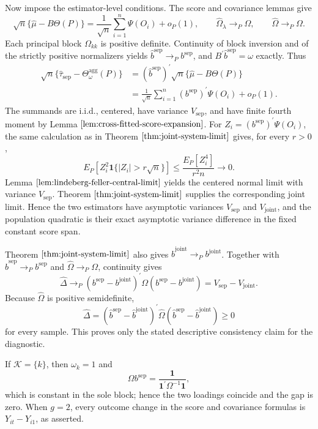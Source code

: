 Now impose the estimator-level conditions.  The score and covariance lemmas give
\[
 \sqrt n\{\widehat\mu-B\Theta(P)\}
 =\frac1{\sqrt n}\sum_{i=1}^n\Psi(O_i)+o_P(1),
 \qquad
 \widehat\Omega_\lambda\to_P\Omega,
 \qquad
 \widehat\Omega\to_P\Omega.
\]
Each principal block \(\Omega_{kk}\) is positive definite.  Continuity of block inversion and of the strictly positive normalizers yields \(\widehat b^{\mathrm{sep}}\to_Pb^{\mathrm{sep}}\), and \(B^{\prime}\widehat b^{\mathrm{sep}}=\omega\) exactly.  Thus
\[
\begin{aligned}
 \sqrt n\{\widehat\tau_{\mathrm{sep}}-\Theta_\omega^{\mathrm{agg}}(P)\}
 &=(\widehat b^{\mathrm{sep}})^{\prime}
   \sqrt n\{\widehat\mu-B\Theta(P)\}\\
 &=\frac1{\sqrt n}\sum_{i=1}^n
   (b^{\mathrm{sep}})^{\prime}\Psi(O_i)+o_P(1).
\end{aligned}
\]
The summands are i.i.d., centered, have variance \(V_{\mathrm{sep}}\), and have finite fourth moment by Lemma \(\ref{lem:cross-fitted-score-expansion}\).  For \(Z_i=(b^{\mathrm{sep}})^{\prime}\Psi(O_i)\), the same calculation as in Theorem \(\ref{thm:joint-system-limit}\) gives, for every \(r>0\),
\[
 E_P[Z_i^2\mathbf 1\{|Z_i|>r\sqrt n\}]
 \le\frac{E_P[Z_i^4]}{r^2n}\to0.
\]
Lemma \(\ref{lem:lindeberg-feller-central-limit}\) yields the centered normal limit with variance \(V_{\mathrm{sep}}\).  Theorem \(\ref{thm:joint-system-limit}\) supplies the corresponding joint limit.  Hence the two estimators have asymptotic variances \(V_{\mathrm{sep}}\) and \(V_{\mathrm{joint}}\), and the population quadratic is their exact asymptotic variance difference in the fixed constant score span.

Theorem \(\ref{thm:joint-system-limit}\) also gives \(\widehat b^{\mathrm{joint}}\to_Pb^{\mathrm{joint}}\).  Together with \(\widehat b^{\mathrm{sep}}\to_Pb^{\mathrm{sep}}\) and \(\widehat\Omega\to_P\Omega\), continuity gives
\[
 \widehat\Delta\to_P
 (b^{\mathrm{sep}}-b^{\mathrm{joint}})^{\prime}
 \Omega(b^{\mathrm{sep}}-b^{\mathrm{joint}})
 =V_{\mathrm{sep}}-V_{\mathrm{joint}}.
\]
Because \(\widehat\Omega\) is positive semidefinite,
\[
 \widehat\Delta
 =(\widehat b^{\mathrm{sep}}-\widehat b^{\mathrm{joint}})^{\prime}
 \widehat\Omega
 (\widehat b^{\mathrm{sep}}-\widehat b^{\mathrm{joint}})\ge0
\]
for every sample.  This proves only the stated descriptive consistency claim for the diagnostic.

If \(\mathcal K=\{k\}\), then \(\omega_k=1\) and
\[
 \Omega b^{\mathrm{sep}}
 =\frac{\mathbf 1}{\mathbf 1^{\prime}\Omega^{-1}\mathbf 1},
\]
which is constant in the sole block; hence the two loadings coincide and the gap is zero.  When \(g=2\), every outcome change in the score and covariance formulas is \(Y_{it}-Y_{i1}\), as asserted.